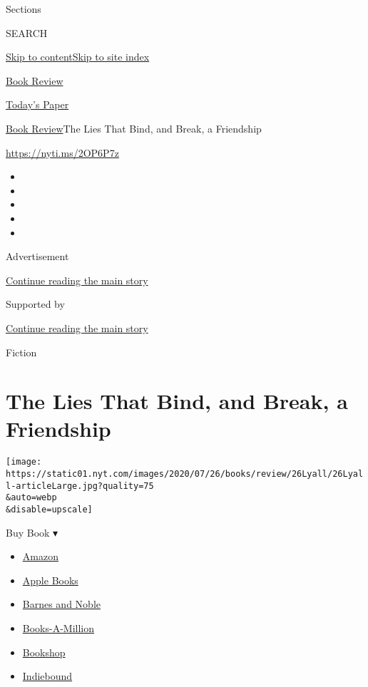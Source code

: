 Sections

SEARCH

\protect\hyperlink{site-content}{Skip to
content}\protect\hyperlink{site-index}{Skip to site index}

\href{https://www.nytimes.com/section/books/review}{Book Review}

\href{https://myaccount.nytimes.com/auth/login?response_type=cookie\&client_id=vi}{}

\href{https://www.nytimes.com/section/todayspaper}{Today's Paper}

\href{/section/books/review}{Book Review}\textbar{}The Lies That Bind,
and Break, a Friendship

\url{https://nyti.ms/2OP6P7z}

\begin{itemize}
\item
\item
\item
\item
\item
\end{itemize}

Advertisement

\protect\hyperlink{after-top}{Continue reading the main story}

Supported by

\protect\hyperlink{after-sponsor}{Continue reading the main story}

Fiction

\hypertarget{the-lies-that-bind-and-break-a-friendship}{%
\section{The Lies That Bind, and Break, a
Friendship}\label{the-lies-that-bind-and-break-a-friendship}}

\texttt{[image: https://static01.nyt.com/images/2020/07/26/books/review/26Lyall/26Lyall-articleLarge.jpg?quality=75\\\&auto=webp\\\&disable=upscale]}

Buy Book ▾

\begin{itemize}
\tightlist
\item
  \href{https://www.amazon.com/gp/search?index=books\&tag=NYTBSREV-20\&field-keywords=Imperfect+Women+Araminta+Hall}{Amazon}
\item
  \href{https://du-gae-books-dot-nyt-du-prd.appspot.com/buy?title=Imperfect+Women\&author=Araminta+Hall}{Apple
  Books}
\item
  \href{https://www.anrdoezrs.net/click-7990613-11819508?url=https\%3A\%2F\%2Fwww.barnesandnoble.com\%2Fw\%2F\%3Fean\%3D9780374272586}{Barnes
  and Noble}
\item
  \href{https://www.anrdoezrs.net/click-7990613-35140?url=https\%3A\%2F\%2Fwww.booksamillion.com\%2Fp\%2FImperfect\%2BWomen\%2FAraminta\%2BHall\%2F9780374272586}{Books-A-Million}
\item
  \href{https://bookshop.org/a/3546/9780374272586}{Bookshop}
\item
  \href{https://www.indiebound.org/book/9780374272586?aff=NYT}{Indiebound}
\end{itemize}

